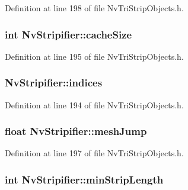 Definition at line 198 of file NvTriStripObjects.h.\hypertarget{class_nv_stripifier_97244655b590f82820a806bedb5ebed2}{
\subsubsection[{cacheSize}]{\setlength{\rightskip}{0pt plus 5cm}int {\bf NvStripifier::cacheSize}}}
\label{class_nv_stripifier_97244655b590f82820a806bedb5ebed2}




Definition at line 195 of file NvTriStripObjects.h.\hypertarget{class_nv_stripifier_7ddcd00526720153c7518a52ff4e9160}{
\subsubsection[{indices}]{ {\bf NvStripifier::indices}}}
\label{class_nv_stripifier_7ddcd00526720153c7518a52ff4e9160}




Definition at line 194 of file NvTriStripObjects.h.\hypertarget{class_nv_stripifier_308a796c34a6951b149820477318260e}{
\subsubsection[{meshJump}]{\setlength{\rightskip}{0pt plus 5cm}float {\bf NvStripifier::meshJump}}}
\label{class_nv_stripifier_308a796c34a6951b149820477318260e}




Definition at line 197 of file NvTriStripObjects.h.\hypertarget{class_nv_stripifier_cab909cd26c771fb14662a3929387c39}{
\subsubsection[{minStripLength}]{\setlength{\rightskip}{0pt plus 5cm}int {\bf NvStripifier::minStripLength}}}
\label{class_nv_stripifier_cab909cd26c771fb14662a3929387c39}




